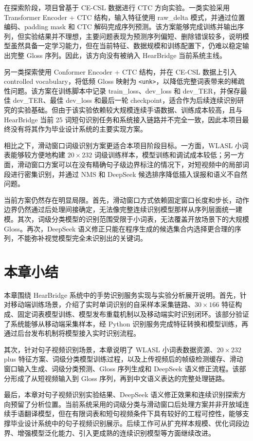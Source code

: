 在探索阶段，项目曾基于 CE-CSL 数据进行 CTC 方向实验。一类实验采用 Transformer Encoder + CTC 结构，输入特征使用 raw\_delta 模式，并通过位置编码、padding mask 和 CTC 解码完成序列预测。该方案能够完成训练并输出序列，但实验结果并不理想，主要问题表现为预测序列偏短、删除错误较多，说明模型虽然具备一定学习能力，但在当前特征、数据规模和训练配置下，仍难以稳定输出完整 Gloss 序列。因此，该方向没有被纳入 HearBridge 当前系统主线。

另一类探索使用 Conformer Encoder + CTC 结构，并在 CE-CSL 数据上引入 controlled vocabulary，将低频 Gloss 映射为 \texttt{<unk>}，以降低完整词表带来的稀疏性问题。该方案在训练脚本中记录 train\_loss、dev\_loss 和 dev\_TER，并保存最佳 dev\_TER、最佳 dev\_loss 和最后一轮 checkpoint，适合作为后续连续识别研究的实验基础。但由于该实验依赖较大规模连续手语数据、训练成本较高，且与 HearBridge 当前 25 词短句识别任务和系统接入链路并不完全一致，因此本项目最终没有将其作为毕业设计系统的主要实现方案。

相比之下，滑动窗口词级识别方案更适合本项目阶段目标。一方面，WLASL 小词表能够较方便地构建 $20\times232$ 词级训练样本，模型训练和调试成本较低；另一方面，滑动窗口方案可以在没有精确句子级边界标注的情况下，对短视频中的局部词段进行密集识别，并通过 NMS 和 DeepSeek 候选排序降低插入误报和语义不自然问题。

当前方案仍然存在明显局限。首先，滑动窗口方式依赖固定窗口长度和步长，动作边界仍然通过后处理间接确定，无法像完整连续识别模型那样从序列层面统一建模。其次，词级分类模型的识别范围受限于小词表，无法覆盖开放场景下的大规模 Gloss。再次，DeepSeek 语义修正只能在程序生成的候选集合内选择更合理的序列，不能弥补视觉模型完全未识别出的关键词。

\section{本章小结}

本章围绕 HearBridge 系统中的手势识别服务实现与实验分析展开说明。首先，针对移动端训练场景，介绍了实时单词识别的自采样本采集链路、$30\times166$ 特征构成、固定词表模型训练、模型发布重载机制以及移动端实时识别闭环。该部分验证了系统能够从移动端采集样本，经 Python 识别服务完成特征转换和模型训练，再通过后台发布机制将模型接入实时识别流程。

其次，针对句子视频识别场景，本章说明了 WLASL 小词表数据资源、$20\times232$ plus 特征方案、词级分类模型训练过程，以及上传视频后的帧级检测缓存、滑动窗口输入生成、词级分类预测、Gloss 序列生成和 DeepSeek 语义修正流程。该部分形成了从短视频输入到 Gloss 序列，再到中文语义表达的完整处理链路。

最后，本章对句子视频识别实验结果、DeepSeek 语义修正效果和连续识别探索方向预留了分析位置。当前系统采用的词级分类与滑动窗口后处理方案并非开放域连续手语翻译模型，但在有限词表和短句视频条件下具有较好的工程可控性，能够支撑毕业设计系统中的句子视频识别展示。后续工作可从扩充样本规模、优化词段边界、增强模型泛化能力、引入更成熟的连续识别模型等方面继续改进。